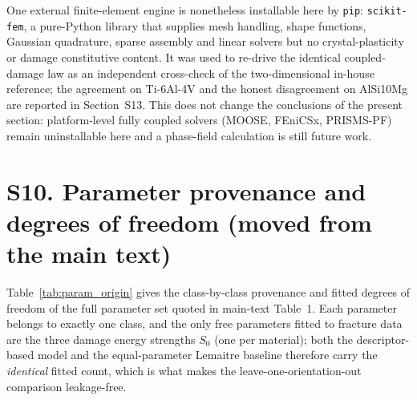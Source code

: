 \documentclass[12pt,a4paper,twocolumn]{article}
\begin{document}
One external finite-element engine is nonetheless installable here by \texttt{pip}: \texttt{scikit-fem}, a
pure-Python library that supplies mesh handling, shape functions, Gaussian quadrature, sparse assembly and
linear solvers but no crystal-plasticity or damage constitutive content. It was used to re-drive the
identical coupled-damage law as an independent cross-check of the two-dimensional in-house reference; the
agreement on Ti-6Al-4V and the honest disagreement on AlSi10Mg are reported in Section~S13. This does not
change the conclusions of the present section: platform-level fully coupled solvers (MOOSE, FEniCSx,
PRISMS-PF) remain uninstallable here and a phase-field calculation is still future work.

\section*{S10. Parameter provenance and degrees of freedom (moved from the main text)}

Table~\ref{tab:param_origin} gives the class-by-class provenance and fitted degrees of freedom of the
full parameter set quoted in main-text Table~1. Each parameter belongs to exactly one class, and the
only free parameters fitted to fracture data are the three damage energy strengths $S_0$ (one per
material); both the descriptor-based model and the equal-parameter Lemaitre baseline therefore carry the
\emph{identical} fitted count, which is what makes the leave-one-orientation-out comparison leakage-free.
\end{document}
